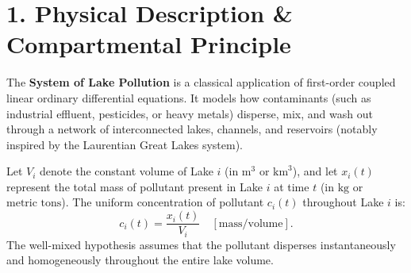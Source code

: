 \documentclass[12pt]{article}
\begin{document}
\vspace{10pt}

\begin{tcolorbox}[
  enhanced, arc=4pt, boxrule=1.5pt,
  colback=white, colframe=primary,
  left=16pt, right=16pt, top=10pt, bottom=10pt,
  title={\bfseries\color{white}\large Contents \& Module Structure},
  colbacktitle=primary, coltitle=white,
]
  \tableofcontents
\end{tcolorbox}

\newpage

\section{1. Physical Description \& Compartmental Principle}

The \textbf{System of Lake Pollution} is a classical application of first-order coupled linear ordinary differential equations. It models how contaminants (such as industrial effluent, pesticides, or heavy metals) disperse, mix, and wash out through a network of interconnected lakes, channels, and reservoirs (notably inspired by the Laurentian Great Lakes system).

\begin{defbox}
Let $V_i$ denote the constant volume of Lake $i$ (in $\text{m}^3$ or $\text{km}^3$), and let $x_i(t)$ represent the total mass of pollutant present in Lake $i$ at time $t$ (in $\text{kg}$ or $\text{metric tons}$).
The uniform concentration of pollutant $c_i(t)$ throughout Lake $i$ is:
\begin{equation}
  c_i(t) = \frac{x_i(t)}{V_i} \quad \left[\text{mass} / \text{volume}\right].
\end{equation}
The well-mixed hypothesis assumes that the pollutant disperses instantaneously and homogeneously throughout the entire lake volume.
\end{defbox}
\end{document}
